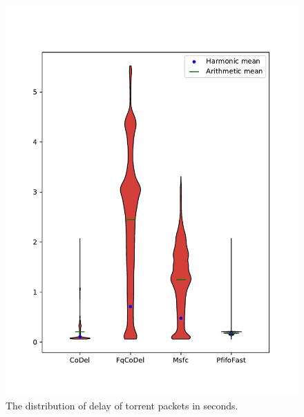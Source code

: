 \begin{figure}
	\centering
	\includegraphics[width=137mm]{drawings/type6-delay-down}
	\caption{The distribution of delay of torrent packets in seconds.}
	\label{fig:torrent_delay}
\end{figure}



